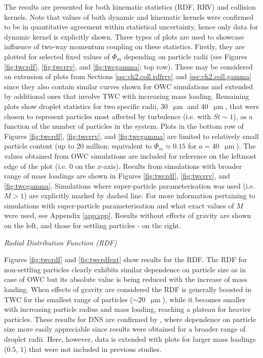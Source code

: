 \documentclass{pracamgren}
\begin{document}
The results are presented for both kinematic statistics (RDF, RRV) and collision kernels.
Note that values of both dynamic and kinematic kernels were confirmed to be in quantitative agreement within statistical uncertainty, hence only data for dynamic kernel is explicitly shown.
Three types of plots are used to showcase influence of two-way momentum coupling on these statistics.
Firstly, they are plotted for selected fixed values of $\Phi_m$ depending on particle radii (see Figures \ref{fig:twcrdf}, \ref{fig:twcrrv}, and \ref{fig:twcgamma}; top row).
These may be considered an extension of plots from Sections \ref{ssc:ch2.coll.rdfrrv} and \ref{ssc:ch2.coll.gamma} since they also contain similar curves shown for OWC simulations and extended by additional ones that involve TWC with increasing mass loading.
Remaining plots show droplet statistics for two specific radii, $30$~$\upmu\text{m}$ and $40$~$\upmu\text{m}$, that were chosen to represent particles most affected by turbulence (i.e. with $St \sim 1$), as a function of the number of particles in the system.
Plots in the bottom row of Figures \ref{fig:twcrdf}, \ref{fig:twcrrv}, and \ref{fig:twcgamma} are limited to relatively small particle content (up to 20 million; equivalent to $\Phi_m \approx 0.15$ for $a = 40$~$\upmu\text{m}$).
The values obtained from OWC simulations are included for reference on the leftmost edge of the plot (i.e. $0$ on the $x$-axis). 
Results from simulations with broader range of mass loadings are shown in Figures \ref{fig:twcrdf}, \ref{fig:twcrrv}, and \ref{fig:twcgamma}.
Simulations where super-particle parameterisation was used (i.e. $M>1$) are explicitly marked by dashed line.
For more information pertaining to simulations with super-particle parameterisation and what exact values of $M$ were used, see Appendix \ref{app:spp}.
Results without effects of gravity are shown on the left, and those for settling particles - on the right. 

\medskip

\emph{Radial Distribution Function (RDF)}

Figures \ref{fig:twcrdf} and \ref{fig:twcrdfext} show results for the RDF.
The RDF for non-settling particles clearly exhibits similar dependence on particle size as in case of OWC but its absolute value is being reduced with the increase of mass loading.
When effects of gravity are considered the RDF is generally boosted in TWC for the smallest range of particles ($\sim 20$~$\upmu\text{m}$), while it becomes smaller with increasing particle radius and mass loading, reaching a plateau for heavier particles.
These results for DNS are confirmed by \textcite[Fig. 19]{Rosa2020}, where dependence on particle size more easily appreciable since results were obtained for a broader range of droplet radii.
Here, however, data is extended with plots for larger mass loadings ($0.5$, $1$) that were not included in previous studies.
\end{document}
